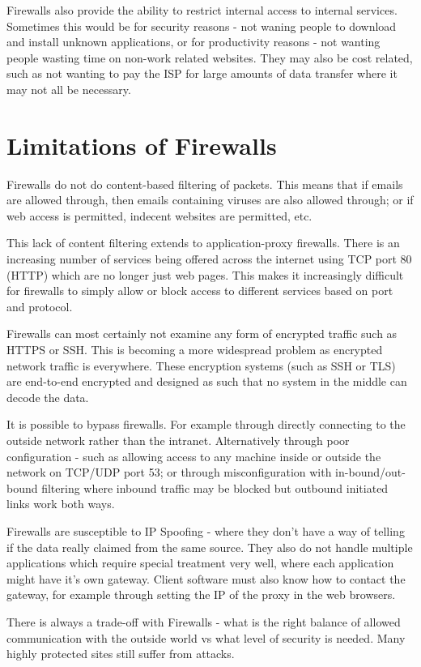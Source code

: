 Firewalls also provide the ability to restrict internal access to internal services. Sometimes this would be for security reasons - not waning people to download and install unknown applications, or for productivity reasons - not wanting people wasting time on non-work related websites. They may also be cost related, such as not wanting to pay the ISP for large amounts of data transfer where it may not all be necessary. 

\section{Limitations of Firewalls}
Firewalls do not do content-based filtering of packets. This means that if emails are allowed through, then emails containing viruses are also allowed through; or if web access is permitted, indecent websites are permitted, etc. 

This lack of content filtering extends to application-proxy firewalls. There is an increasing number of services being offered across the internet using TCP port 80 (HTTP) which are no longer just web pages. This makes it increasingly difficult for firewalls to simply allow or block access to different services based on port and protocol. 

Firewalls can most certainly not examine any form of encrypted traffic such as HTTPS or SSH. This is becoming a more widespread problem as encrypted network traffic is everywhere. These encryption systems (such as SSH or TLS) are end-to-end encrypted and designed as such that no system in the middle can decode the data. 

It is possible to bypass firewalls. For example through directly connecting to the outside network rather than the intranet. Alternatively through poor configuration - such as allowing access to any machine inside or outside the network on TCP/UDP port 53; or through misconfiguration with in-bound/out-bound filtering where inbound traffic may be blocked but outbound initiated links work both ways. 

Firewalls are susceptible to IP Spoofing - where they don't have a way of telling if the data really claimed from the same source. They also do not handle multiple applications which require special treatment very well, where each application might have it's own gateway. Client software must also know how to contact the gateway, for example through setting the IP of the proxy in the web browsers. 

There is always a trade-off with Firewalls - what is the right balance of allowed communication with the outside world vs what level of security is needed. Many highly protected sites still suffer from attacks. 

